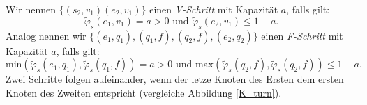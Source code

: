 \begin{definition}[C-Schritte]
Wir nennen $\{(s_2,v_1)(e_2,v_1)\}$ einen \textit{V-Schritt} mit Kapazität $a$, falls gilt: 
$$\tilde{\varphi}_s(e_1,v_1) = a > 0 \text{ und } \tilde{\varphi}_s(e_2,v_1) \leq 1 - a.$$ 
Analog nennen wir $\{(e_1,q_1),(q_1,f),(q_2,f),(e_2,q_2)\}$ einen \textit{F-Schritt} mit Kapazität $a$, falls gilt:
$$\text{min}(\tilde{\varphi}_s(e_1,q_1),\tilde{\varphi}_s(q_1,f)) = a > 0 \text{ und } \text{max}(\tilde{\varphi}_s(q_2,f),\tilde{\varphi}_s(q_2,f)) \leq 1 - a.$$
Zwei Schritte folgen aufeinander, wenn der letze Knoten des Ersten dem ersten Knoten des Zweiten entspricht (vergleiche Abbildung \ref{K_turn}).
\end{definition}


